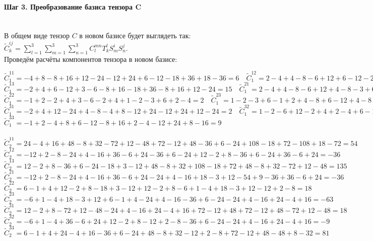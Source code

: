 \documentclass{article}
\begin{document}
\paragraph*{Шаг 3. Преобразование базиса тензора C} \, \\
В общем виде тензор $C$ в новом базисе будет выглядеть так: $\tilde{C}^{ij}_{k} = \sum\limits_{l=1}^{3}\sum\limits_{m=1}^{3}\sum\limits_{n=1}^{3}C^{mn}_{l}T^l_kS^i_mS^j_n$. \\
Проведём расчёты компонентов тензора в новом базисе:
\begin{center}
$\tilde{C}^{11}_1 = -4+8-8+16+12-24-12+24+6-12-18+36+18-36 = 6 \quad \tilde{C}^{12}_1 = 2-4+4-8-6+12+6-12-2+4+6-12-6+12 = -4$ \\
$\tilde{C}^{13}_1 = -2+4+6-12+3-6-8+16-18+36-8+16+12-24 = 15 \quad \tilde{C}^{21}_1 = 2-4+4-8-6+12+4-8-3+6+9-18-6+12 = -4$ \\
$\tilde{C}^{22}_1 = -1+2-2+4+3-6-2+4+1-2-3+6+2-4 = 2 \quad \tilde{C}^{23}_1 = 1-2-3+6-1+2+4-8+6-12+4-8-4+8 = -7$ \\
$\tilde{C}^{31}_1 = -2+4+12-24+4-8-4+8-12+24-12+24+12-24 = 2 \quad \tilde{C}^{32}_1 = 1-2-6+12-2+4+2-4+6-12+4-8-4+8 = -1$ \\
$\tilde{C}^{33}_1 = -1+2-4+8+6-12-8+16+2-4-12+24+8-16 = 9$ \\ \, \\

$\tilde{C}^{11}_{2}=24-4+16+48-8+32-72+12-48+72-12+48-36+6-24+108-18+72-108+18-72 = 54$ \\ $\tilde{C}^{12}_2 = -12+2-8-24+4-16+36-6+24-36+6-24+12-2+8-36+6-24+36-6+24 = -36$ \\
$\tilde{C}^{13}_2 = 12-2+8-36+6-24-18+3-12+48-8+32+108-18+72+48-8+32-72+12-48 = 135$ \\ $\tilde{C}^{21}_2 = -12+2-8-24+4-16+36-6+24-24+4-16+18-3+12-54+9-36+36-6+24 = -36$ \\
$\tilde{C}^{22}_2 = 6-1+4+12-2+8-18+3-12+12-2+8-6+1-4+18-3+12-12+2-8 = 18$ \\ $\tilde{C}^{23}_2 = -6+1-4+18-3+12+6-1+4-24+4-16-36+6-24-24+4-16+24-4+16 = -63$ \\
$\tilde{C}^{31}_2 = 12-2+8-72+12-48-24+4-16+24-4+16+72-12+48+72-12+48-72+12-48 = 18$ \\ $\tilde{C}^{32}_2 = -6+1-4+36-6+24+12-2+8-12+2-8-36+6-24-24+4-16+24-4+16 = -9$ \\
$\tilde{C}^{33}_2 = 6-1+4+24-4+16-36+6-24+48-8+32-12+2-8+72-12+48-48+8-32 = 81$ \\ \, \\


\end{center}
\end{document}
